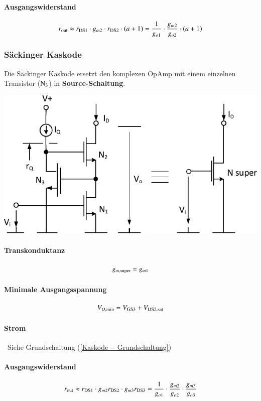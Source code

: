 \paragraph{Ausgangswiderstand}

\vspace{-0.3cm}
\[
    r_{\rm out} \approx r_{\rm DS1} \cdot g_{m2} \cdot r_{\rm DS2} \cdot (a + 1) = \frac{1}{g_{o1}} \cdot \frac{g_{m2}}{g_{o2}} \cdot (a + 1)
\]


\subsubsection{Säckinger Kaskode}
Die Säckinger Kaskode ersetzt den komplexen OpAmp mit einem einzelnen Transistor ($\rm N_3$) in \textbf{Source-Schaltung}.

\smallskip

\begin{minipage}[t]{0.55\columnwidth}
    \includegraphics[width=\columnwidth, align=t]{images/05_stromquelle_geregelte_kaskode_FET.pdf}
\end{minipage}
\hfill
\begin{minipage}[t]{0.42\columnwidth}

    \paragraph{Transkonduktanz}

    \vspace{-0.3cm}
    \[
        g_{m,\rm super} = g_{m1}
    \]            

    \paragraph{Minimale Ausgangsspannung}

    \vspace{-0.2cm}
    \[
        V_{O, \rm min} =  V_{\rm GS3} + V_{\rm DS2, sat}
    \]

    \paragraph{Strom}

    \textrightarrow\ Siehe Grundschaltung (\ref{Kaskode -- Grundschaltung})
\end{minipage}


\paragraph{Ausgangswiderstand}

\vspace{-0.3cm}
\[
    r_{\rm out} \approx r_{\rm DS1} \cdot g_{m2} r_{\rm DS2} \cdot g_{m3} r_{\rm DS3} = \frac{1}{g_{o1}} \cdot \frac{g_{m2}}{g_{o2}} \cdot \frac{g_{m3}}{g_{o3}}
\]

